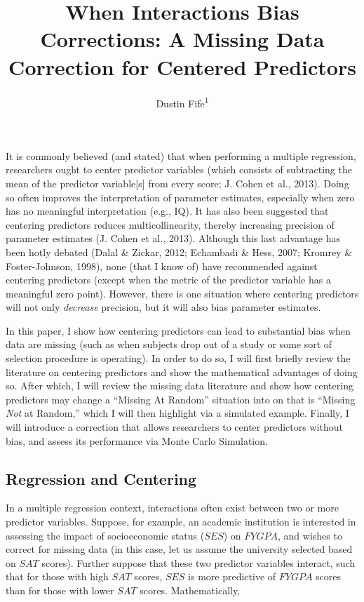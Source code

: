 \documentclass[english,man]{apa6}
\title{When Interactions Bias Corrections: A Missing Data Correction for
Centered Predictors}
\author{Dustin Fife\textsuperscript{1}}
\affiliation{
    \vspace{0.5cm}
          \textsuperscript{1} Rowan University  }
\theoremstyle{definition}
\theoremstyle{definition}
\theoremstyle{remark}
\begin{document}
\maketitle

\setcounter{secnumdepth}{0}



It is commonly believed (and stated) that when performing a multiple
regression, researchers ought to center predictor variables (which
consists of subtracting the mean of the predictor variable{[}s{]} from
every score; J. Cohen et al., 2013). Doing so often improves the
interpretation of parameter estimates, especially when zero has no
meaningful interpretation (e.g., IQ). It has also been suggested that
centering predictors reduces multicollinearity, thereby increasing
precision of parameter estimates (J. Cohen et al., 2013). Although this
last advantage has been hotly debated (Dalal \& Zickar, 2012; Echambadi
\& Hess, 2007; Kromrey \& Foster-Johnson, 1998), none (that I know of)
have recommended against centering predictors (except when the metric of
the predictor variable has a meaningful zero point). However, there is
one situation where centering predictors will not only \emph{decrease}
precision, but it will also bias parameter estimates.

In this paper, I show how centering predictors can lead to substantial
bias when data are missing (such as when subjects drop out of a study or
some sort of selection procedure is operating). In order to do so, I
will first briefly review the literature on centering predictors and
show the mathematical advantages of doing so. After which, I will review
the missing data literature and show how centering predictors may change
a \enquote{Missing At Random} situation into on that is \enquote{Missing
\emph{Not} at Random,} which I will then highlight via a simulated
example. Finally, I will introduce a correction that allows researchers
to center predictors without bias, and assess its performance via Monte
Carlo Simulation.

\subsection{Regression and Centering}\label{regression-and-centering}

In a multiple regression context, interactions often exist between two
or more predictor variables. Suppose, for example, an academic
institution is interested in assessing the impact of socioeconomic
status (\(SES\)) on \(FYGPA\), and wishes to correct for missing data
(in this case, let us assume the university selected based on \(SAT\)
scores). Further suppose that these two predictor variables interact,
such that for those with high \(SAT\) scores, \(SES\) is more predictive
of \(FYGPA\) scores than for those with lower \(SAT\) scores.
Mathematically,
\end{document}
